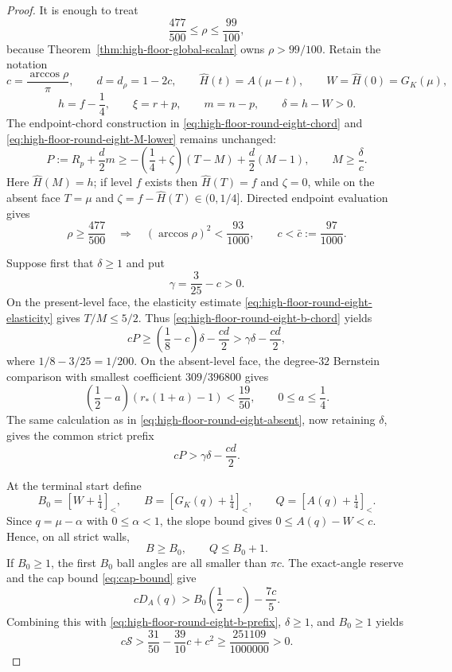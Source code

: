 \documentclass[11pt]{article}
\theoremstyle{remark}
\newcommand{\sbr}[1]{[#1]_{<}}
\begin{document}
\begin{proof}
It is enough to treat
\[
 \frac{477}{500}\leq\rho\leq\frac{99}{100},
\]
because Theorem~\ref{thm:high-floor-global-scalar} owns
$\rho>99/100$.  Retain the notation
\[
 c=\frac{\arccos\rho}{\pi},\qquad d=d_\rho=1-2c,
 \qquad \widehat H(t)=A(\mu-t),\qquad
 W=\widehat H(0)=G_K(\mu),
\]
\[
 h=f-\frac14,\qquad \xi=r+p,\qquad m=n-p,
 \qquad \delta=h-W>0.
\]
The endpoint-chord construction in
\eqref{eq:high-floor-round-eight-chord} and
\eqref{eq:high-floor-round-eight-M-lower} remains unchanged:
\begin{equation}
 P:=R_p+\frac d2m
 \geq-\left(\frac14+\zeta\right)(T-M)
       +\frac d2(M-1),\qquad
 M\geq\frac\delta c.
 \label{eq:high-floor-round-eight-b-chord}
\end{equation}
Here $\widehat H(M)=h$; if level $f$ exists then
$\widehat H(T)=f$ and $\zeta=0$, while on the absent face
$T=\mu$ and $\zeta=f-\widehat H(T)\in(0,1/4]$.
Directed endpoint evaluation gives
\begin{equation}
 \rho\geq\frac{477}{500}
 \quad\Longrightarrow\quad
 (\arccos\rho)^2<\frac{93}{1000},\qquad
 c<\bar c:=\frac{97}{1000}.
 \label{eq:high-floor-round-eight-b-ratio}
\end{equation}

Suppose first that $\delta\geq1$ and put
\[
 \gamma=\frac3{25}-c>0.
\]
On the present-level face, the elasticity estimate
\eqref{eq:high-floor-round-eight-elasticity} gives $T/M\leq5/2$.
Thus \eqref{eq:high-floor-round-eight-b-chord} yields
\[
 cP\geq\left(\frac18-c\right)\delta-\frac{cd}{2}
 >\gamma\delta-\frac{cd}{2},
\]
where $1/8-3/25=1/200$.  On the absent-level face, the degree-$32$
Bernstein comparison with smallest coefficient $309/396800$ gives
\[
 \left(\frac12-a\right)(r_*(1+a)-1)<\frac{19}{50},
 \qquad 0\leq a\leq\frac14.
\]
The same calculation as in
\eqref{eq:high-floor-round-eight-absent}, now retaining $\delta$, gives
the common strict prefix
\begin{equation}
 \boxed{cP>\gamma\delta-\frac{cd}{2}.}
 \label{eq:high-floor-round-eight-b-prefix}
\end{equation}

At the terminal start define
\[
 B_0=\sbr{W+\tfrac14},\qquad
 B=\sbr{G_K(q)+\tfrac14},\qquad
 Q=\sbr{A(q)+\tfrac14}.
\]
Since $q=\mu-\alpha$ with $0\leq\alpha<1$, the slope bound gives
$0\leq A(q)-W<c$.  Hence, on all strict walls,
\begin{equation}
 B\geq B_0,\qquad Q\leq B_0+1.
 \label{eq:high-floor-round-eight-b-counts}
\end{equation}
If $B_0\geq1$, the first $B_0$ ball angles are all smaller than
$\pi c$.  The exact-angle reserve and the cap bound
\eqref{eq:cap-bound} give
\[
 cD_A(q)>
 B_0\left(\frac12-c\right)-\frac{7c}{5}.
\]
Combining this with
\eqref{eq:high-floor-round-eight-b-prefix}, $\delta\geq1$, and
$B_0\geq1$ yields
\begin{equation}
 c\mathcal S>\frac{31}{50}-\frac{39}{10}c+c^2
 \geq\frac{251109}{1000000}>0.
 \label{eq:high-floor-round-eight-b-positive-level}
\end{equation}


\end{proof}
\end{document}

